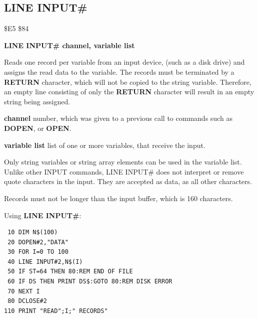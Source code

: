 \subsection{LINE INPUT\#}
\begin{description}[leftmargin=2cm,style=nextline]
\item [Token:] \$E5 \$84
\item [Format:] {\bf LINE INPUT\# channel, variable list}
\item [Usage:] Reads one record per variable from an input device,
              (such as a disk drive)
               and assigns the read data to the variable.
               The records must be terminated by a {\bf RETURN}
               character, which will not be copied to the string variable.
               Therefore, an empty line consisting of only the {\bf RETURN} character
               will result in an empty string being assigned.

               {\bf channel} number, which was given to a previous
               call to commands such as {\bf DOPEN}, or {\bf OPEN}.

               {\bf variable list} list of one or more
               variables, that receive the input.

\item [Remarks:] Only string variables or string array elements
                 can be used in the variable list.
                 Unlike other INPUT commands, {LINE INPUT\#} does
                 not interpret or remove quote characters in the input.
                 They are accepted as data, as all other characters.

                 Records must not be longer than the input buffer, which is 160 characters.

\item [Example:] Using {\bf LINE INPUT\#}:
\begin{tcolorbox}[colback=black,coltext=white]
\verbatimfont{\codefont}
\begin{verbatim}
 10 DIM N$(100)
 20 DOPEN#2,"DATA"
 30 FOR I=0 TO 100
 40 LINE INPUT#2,N$(I)
 50 IF ST=64 THEN 80:REM END OF FILE
 60 IF DS THEN PRINT DS$:GOTO 80:REM DISK ERROR
 70 NEXT I
 80 DCLOSE#2
110 PRINT "READ";I;" RECORDS"
\end{verbatim}
\end{tcolorbox}
\end{description}


